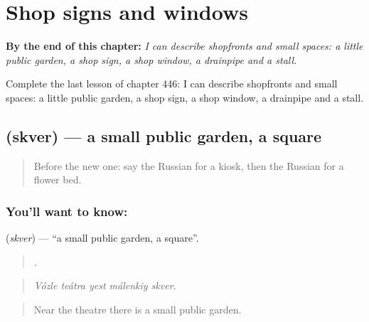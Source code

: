 
\chapter{Shop signs and windows}
\label{ch:ru-shop-signs-and-windows}

\begin{chapteropening}
\textbf{By the end of this chapter:} \emph{I can describe shopfronts and small spaces: a little public garden, a shop sign, a shop window, a drainpipe and a stall.}

Complete the last lesson of chapter 446: I can describe shopfronts and small spaces: a little public garden, a shop sign, a shop window, a drainpipe and a stall.
\end{chapteropening}

\section[\texorpdfstring{\ru{сквер} (skver)}{сквер (skver)}]{ (skver) — a small public garden, a square}

\label{lesson:RU-C446-skver}



\begin{quote}
Before the new one: say the Russian for a kiosk, then the Russian for a flower bed.
\end{quote}

\subsection*{You'll want to know: }
\textbf{} (\emph{skver}) — \textquotedblleft{}a small public garden, a square\textquotedblright{}.

\begin{quote}
    .
\end{quote}

\begin{quote}
\emph{Vózle teátra yest málenkiy skver.}
\end{quote}

\begin{quote}
Near the theatre there is a small public garden.
\end{quote}

